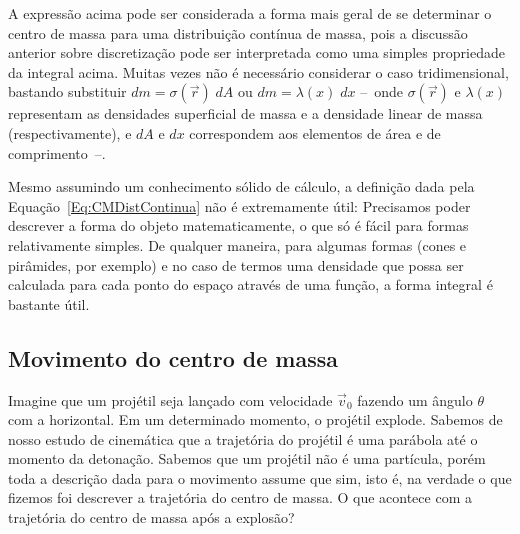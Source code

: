 A expressão acima pode ser considerada a forma mais geral de se determinar o centro de massa para uma distribuição contínua de massa, pois a discussão anterior sobre discretização pode ser interpretada como uma simples propriedade da integral acima. Muitas vezes não é necessário considerar o caso tridimensional, bastando substituir $dm = \sigma(\vec{r}) \; dA$ ou $dm = \lambda(x) \; dx$ --~onde $\sigma(\vec{r})$ e $\lambda(x)$ representam as densidades superficial de massa e a densidade linear de massa (respectivamente), e $dA$ e $dx$ correspondem aos elementos de área e de comprimento~--.

Mesmo assumindo um conhecimento sólido de cálculo, a definição dada pela Equação~\eqref{Eq:CMDistContinua} não é extremamente útil: Precisamos poder descrever a forma do objeto matematicamente, o que só é fácil para formas relativamente simples. De qualquer maneira, para algumas formas (cones e pirâmides, por exemplo) e no caso de termos uma densidade que possa ser calculada para cada ponto do espaço através de uma função, a forma integral é bastante útil.

\subsection{Movimento do centro de massa}

Imagine que um projétil seja lançado com velocidade $\vec{v}_0$ fazendo um ângulo $\theta$ com a horizontal. Em um determinado momento, o projétil explode. Sabemos de nosso estudo de cinemática que a trajetória do projétil é uma parábola até o momento da detonação. Sabemos que um projétil não é uma partícula, porém toda a descrição dada para o movimento assume que sim, isto é, na verdade o que fizemos foi descrever a trajetória do centro de massa. O que acontece com a trajetória do centro de massa após a explosão?

